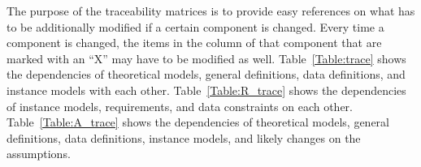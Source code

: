 \documentclass[12pt]{article}
\begin{document}
	The purpose of the traceability matrices is to provide easy references on what
	has to be additionally modified if a certain component is changed.  Every time a
	component is changed, the items in the column of that component that are marked
	with an ``X'' may have to be modified as well.  Table~\ref{Table:trace} shows
	the
	dependencies of theoretical models, general definitions, data definitions, and
	instance models with each other. Table~\ref{Table:R_trace} shows the
	dependencies of instance models, requirements, and data constraints on each
	other. Table~\ref{Table:A_trace} shows the dependencies of theoretical models,
	general definitions, data definitions, instance models, and likely changes on
	the assumptions.
	
	
	
	
\end{document}
